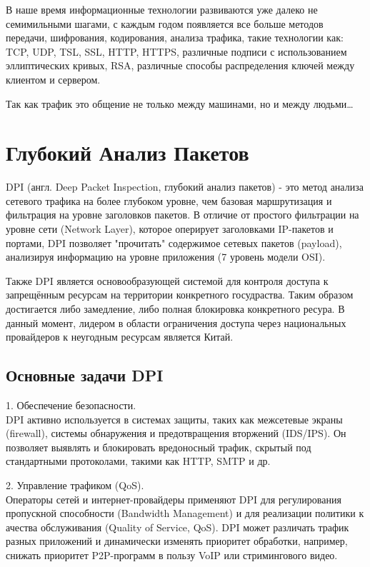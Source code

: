 \documentclass[utf8,14pt,a4paper,oneside,russian]{book}
\begin{document}
В наше время информационные технологии развиваются уже далеко не семимильными шагами, с каждым годом
появляется все больше методов передачи, шифрования, кодирования, анализа трафика, такие технологии как:
TCP, UDP, TSL, SSL, HTTP, HTTPS, различные подписи с использованием эллиптических кривых, RSA, различные
способы распределения ключей между клиентом и сервером.

Так как трафик это общение не только между машинами, но и между людьми\dots


\newpage
\section{Глубокий Анализ Пакетов}

DPI (англ. Deep Packet Inspection, глубокий анализ пакетов) - это метод анализа сетевого трафика на более глубоком уровне, чем базовая
маршрутизация и фильтрация на уровне заголовков пакетов. В отличие от простого фильтрации на уровне сети (Network Layer), которое оперирует
заголовками IP-пакетов и портами, DPI позволяет "прочитать" содержимое сетевых пакетов (payload), анализируя информацию на уровне приложения
(7 уровень модели OSI).

Также DPI является основообразующей системой для контроля доступа к запрещённым ресурсам на территории конкретного госудраства.
Таким образом достигается либо замедление, либо полная блокировка конкретного ресура. В данный момент, лидером в области ограничения доступа
через национальных провайдеров к неугодным ресурсам является Китай.

\subsection{Основные задачи DPI}

1. Обеспечение безопасности.\\
DPI активно используется в системах защиты, таких как межсетевые экраны (firewall), системы обнаружения и предотвращения вторжений (IDS/IPS).
Он позволяет выявлять и блокировать вредоносный трафик, скрытый под стандартными протоколами, такими как HTTP, SMTP и др.

2. Управление трафиком (QoS).\\
Операторы сетей и интернет-провайдеры применяют DPI для регулирования пропускной способности (Bandwidth Management) и для реализации политики к
ачества обслуживания (Quality of Service, QoS). DPI может различать трафик разных приложений и динамически изменять приоритет обработки, например,
снижать приоритет P2P-программ в пользу VoIP или стримингового видео.
\end{document}
